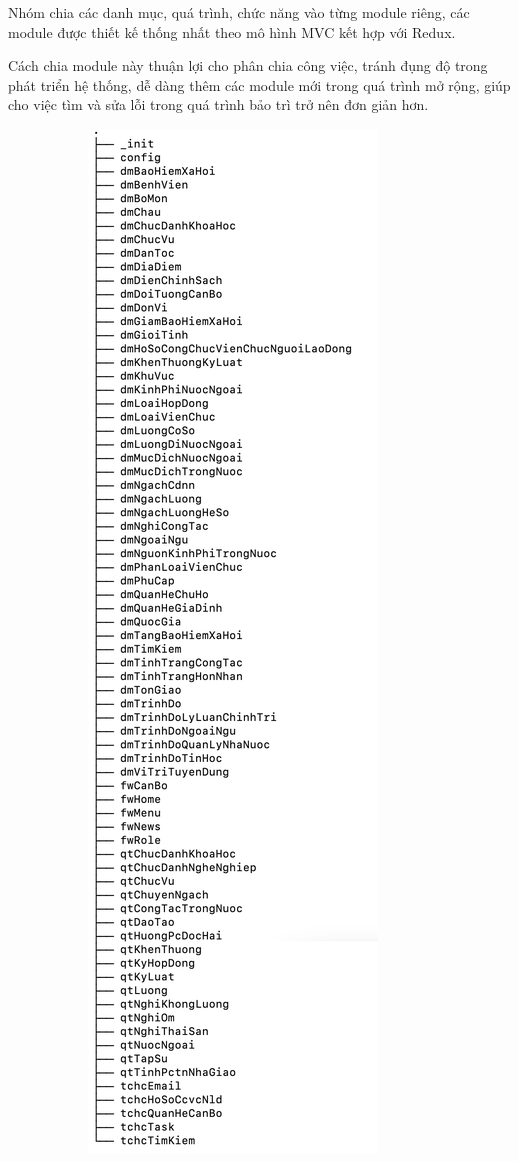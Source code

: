 Nhóm chia các danh mục, quá trình, chức năng vào từng module riêng, các module được thiết kế thống nhất theo mô hình MVC kết hợp với Redux. 

Cách chia module này thuận lợi cho phân chia công việc, tránh đụng độ trong phát triển hệ thống, dễ dàng thêm các module mới trong quá trình mở rộng, giúp cho việc tìm và sửa lỗi trong quá trình bảo trì trở nên đơn giản hơn.

\begin{figure}[H]
    \centering
    \begin{subfigure}[b]{0.4\linewidth}
        \includegraphics[width=\linewidth]{img/module.png}

\end{subfigure}
\end{figure}
